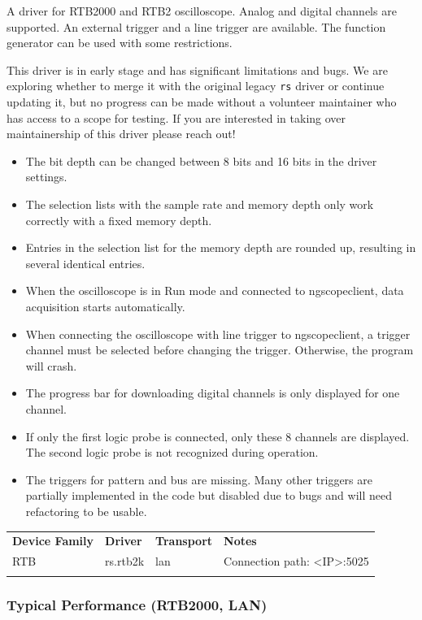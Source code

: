 A driver for RTB2000 and RTB2 oscilloscope.
Analog and digital channels are supported. An external trigger and a line trigger are available.
The function generator can be used with some restrictions.

This driver is in early stage and has significant limitations and bugs. We are exploring whether to merge it with the
original legacy \texttt{rs} driver or continue updating it, but no progress can be made without a volunteer maintainer
who has access to a scope for testing. If you are interested in taking over maintainership of this driver please reach
out!

\begin{itemize}
\item The bit depth can be changed between 8 bits and 16 bits in the driver settings.
\item The selection lists with the sample rate and memory depth only work correctly with a fixed memory depth.
\item Entries in the selection list for the memory depth are rounded up, resulting in several identical entries.
\item When the oscilloscope is in Run mode and connected to ngscopeclient, data acquisition starts automatically.
\item When connecting the oscilloscope with line trigger to ngscopeclient, a trigger channel must be selected before changing the trigger. Otherwise, the program will crash.
\item The progress bar for downloading digital channels is only displayed for one channel.
\item If only the first logic probe is connected, only these 8 channels are displayed. The second logic probe is not recognized during operation.
\item The triggers for pattern and bus are missing. Many other triggers are partially implemented in the code but disabled due to bugs and will need refactoring to be usable.
\end{itemize}

\begin{tabularx}{16cm}{lllX}
\thickhline
\textbf{Device Family} & \textbf{Driver} & \textbf{Transport} & \textbf{Notes} \\
\thickhline
RTB & rs.rtb2k & lan & Connection path: <IP>:5025 \\
\thickhline
\end{tabularx}

\subsubsection{Typical Performance (RTB2000, LAN)}

